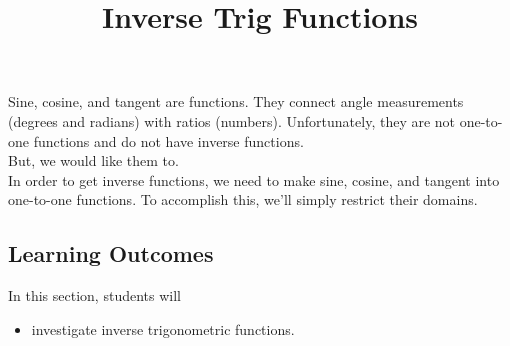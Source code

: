 \documentclass{ximera}
\title{Inverse Trig Functions}
\begin{document}
\begin{abstract}
%
\end{abstract}
\maketitle




Sine, cosine, and tangent are functions. They connect angle measurements (degrees and radians) with ratios (numbers). Unfortunately, they are not one-to-one functions and do not have inverse functions. \\

But, we would like them to.\\

In order to get inverse functions, we need to make sine, cosine, and tangent into one-to-one functions.  To accomplish this, we'll simply restrict their domains.














\subsection{Learning Outcomes}

\begin{sectionOutcomes}
In this section, students will 

\begin{itemize}
\item investigate inverse trigonometric functions.
\end{itemize}
\end{sectionOutcomes}
\end{document}
